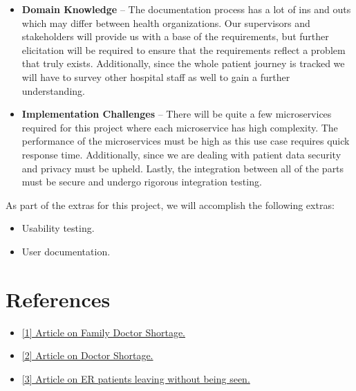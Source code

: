 \documentclass{article}
\begin{document}
\begin{itemize}
    \item \textbf{Domain Knowledge} -- The documentation process has a lot of ins and outs which may differ between health organizations. Our supervisors and stakeholders will provide us with a base of the requirements, but further elicitation will be required to ensure that the requirements reflect a problem that truly exists. Additionally, since the whole patient journey is tracked we will have to survey other hospital staff as well to gain a further understanding.
    \item \textbf{Implementation Challenges} -- There will be quite a few microservices required for this project where each microservice has high complexity. The performance of the microservices must be high as this use case requires quick response time. Additionally, since we are dealing with patient data security and privacy must be upheld. Lastly, the integration between all of the parts must be secure and undergo rigorous integration testing.
\end{itemize}

As part of the extras for this project, we will accomplish the following extras:
\begin{itemize}
    \item Usability testing.
    \item User documentation.
\end{itemize}

\section{References}
\begin{itemize}
  \item 
  \href{https://www.cbc.ca/news/canada/toronto/ontario-family-doctor-shortage-record-high-1.7261558 }{[1] Article on Family Doctor Shortage.}
  \item 
  \href{https://www.cbc.ca/news/canada/toronto/family-doctor-shortage-oma-1.7097935}{[2] Article on Doctor Shortage.}
  \item 
  \href{https://www.ices.on.ca/publications/journal-articles/association-between-waiting-times-and-short-term-mortality-and-hospital-admission-after-departure-from-the-emergency-department-population-based-cohort-study-from-ontario-canada/}{[3] Article on ER patients leaving without being seen.}
\end {itemize}

\newpage{}
\end{document}
